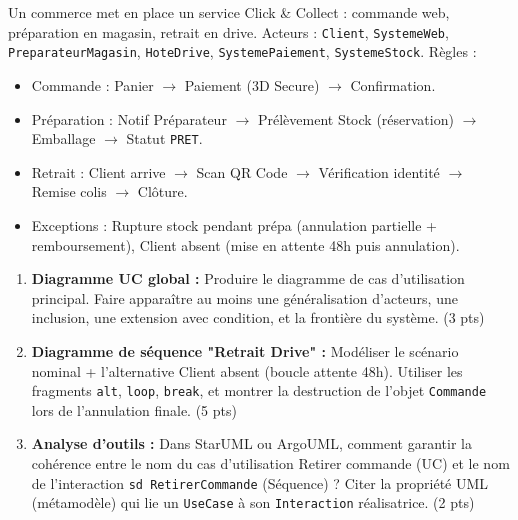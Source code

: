 \documentclass[11pt]{article}
\begin{document}
\begin{exercice}
\label{exo:click_collect}
Un commerce met en place un service \og{}Click \& Collect\fg{} : commande web, préparation en magasin, retrait en drive.
Acteurs : \texttt{Client}, \texttt{SystemeWeb}, \texttt{PreparateurMagasin}, \texttt{HoteDrive}, \texttt{SystemePaiement}, \texttt{SystemeStock}.
Règles :
\begin{itemize}
    \item Commande : Panier $\rightarrow$ Paiement (3D Secure) $\rightarrow$ Confirmation.
    \item Préparation : Notif Préparateur $\rightarrow$ Prélèvement Stock (réservation) $\rightarrow$ Emballage $\rightarrow$ Statut \texttt{PRET}.
    \item Retrait : Client arrive $\rightarrow$ Scan QR Code $\rightarrow$ Vérification identité $\rightarrow$ Remise colis $\rightarrow$ Clôture.
    \item Exceptions : Rupture stock pendant prépa (annulation partielle + remboursement), Client absent (mise en attente 48h puis annulation).
\end{itemize}

\begin{enumerate}
    \item \textbf{Diagramme UC global :} Produire le diagramme de cas d'utilisation principal. Faire apparaître au moins une généralisation d'acteurs, une inclusion, une extension avec condition, et la frontière du système. (3 pts)
    \item \textbf{Diagramme de séquence "Retrait Drive" :} Modéliser le scénario nominal + l'alternative \og{}Client absent\fg{} (boucle attente 48h). Utiliser les fragments \texttt{alt}, \texttt{loop}, \texttt{break}, et montrer la destruction de l'objet \texttt{Commande} lors de l'annulation finale. (5 pts)
    \item \textbf{Analyse d'outils :} Dans StarUML ou ArgoUML, comment garantir la cohérence entre le nom du cas d'utilisation \og{}Retirer commande\fg{} (UC) et le nom de l'interaction \texttt{sd RetirerCommande} (Séquence) ? Citer la propriété UML (métamodèle) qui lie un \texttt{UseCase} à son \texttt{Interaction} réalisatrice. (2 pts)
\end{enumerate}
\end{exercice}
\end{document}
